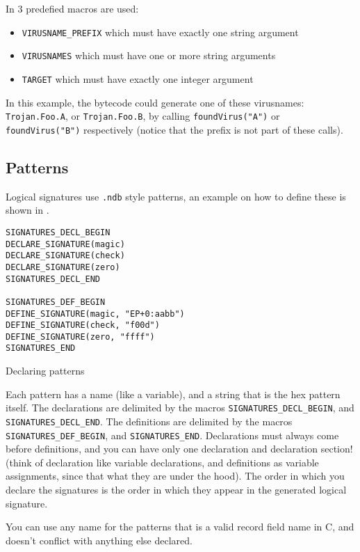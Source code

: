 In  3 predefied macros are used:
\begin{itemize}
 \item \verb+VIRUSNAME_PREFIX+ which must have exactly one string argument
 \item \verb+VIRUSNAMES+ which must have one or more string arguments
 \item \verb+TARGET+ which must have exactly one integer argument
\end{itemize}

In this example, the bytecode could generate one of these virusnames:
\verb+Trojan.Foo.A+, or \verb+Trojan.Foo.B+, by calling
\verb+foundVirus("A")+ or \verb+foundVirus("B")+ respectively (notice that the prefix is not part of these calls).

\subsection{Patterns}
Logical signatures use \verb+.ndb+ style patterns, an example on how to define these
is shown in .
\begin{program}
\begin{lstlisting}
SIGNATURES_DECL_BEGIN
DECLARE_SIGNATURE(magic)
DECLARE_SIGNATURE(check)
DECLARE_SIGNATURE(zero)
SIGNATURES_DECL_END

SIGNATURES_DEF_BEGIN
DEFINE_SIGNATURE(magic, "EP+0:aabb")
DEFINE_SIGNATURE(check, "f00d")
DEFINE_SIGNATURE(zero, "ffff")
SIGNATURES_END
\end{lstlisting}
\caption{Declaring patterns}
\label{prg:patterns}
\end{program}

Each pattern has a name (like a variable), and a string that is the hex pattern itself.
The declarations are delimited by the macros \verb+SIGNATURES_DECL_BEGIN+, and \verb+SIGNATURES_DECL_END+.
The definitions are delimited by the macros \verb+SIGNATURES_DEF_BEGIN+, and \verb+SIGNATURES_END+.
Declarations must always come before definitions, and you can have only one
declaration and declaration section!
(think of declaration like variable
declarations, and definitions as variable assignments, since that what they are under the hood).
The order in which you declare the signatures is the order in which they appear in the generated
logical signature.

You can use any name for the patterns that is a valid record field name in C, 
and doesn't conflict with anything else declared.

